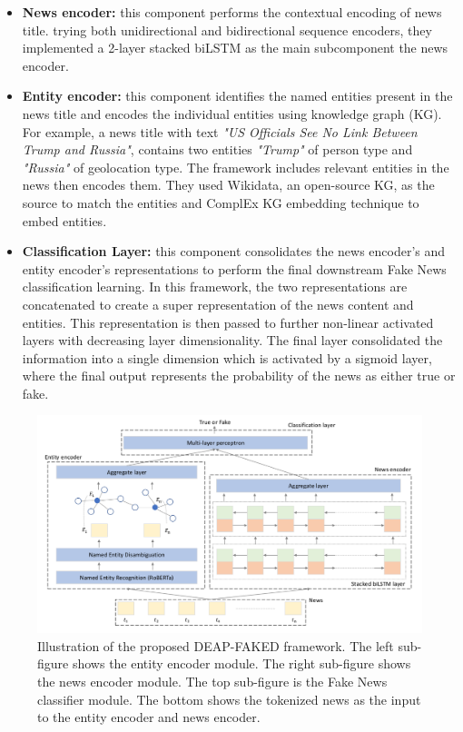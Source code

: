 \documentclass[conference]{IEEEtran}
\begin{document}
\begin{appendices}
\begin{itemize}
\item \textbf{News encoder:} this component performs the contextual encoding of news title. trying both unidirectional and bidirectional sequence encoders, they implemented a 2-layer stacked biLSTM as the main subcomponent the news encoder.
\item \textbf{Entity encoder:} this component identifies the named entities present in the news title and encodes the individual entities using knowledge graph (KG).
For example, a news title with text \textit{"US Officials See No Link Between Trump and Russia"}, contains two entities \textit{"Trump"} of person type and \textit{"Russia"} of geolocation type.
The framework includes relevant entities in the news then encodes them. They used Wikidata, an open-source KG, as the source to match the entities and ComplEx KG embedding technique to embed entities.
\item \textbf{Classification Layer:} this component consolidates the news encoder's and entity encoder's representations to perform the final downstream Fake News classification learning.
In this framework, the two representations are concatenated to create a super representation of the news content and entities. This representation is then passed to further non-linear activated layers with decreasing layer dimensionality. The final layer consolidated the information into a single dimension which is activated by a sigmoid layer, where the final output represents the probability of the news as either true or fake.
\end{itemize}

\begin{figure}[htp]
	\centering
	\includegraphics[scale=0.45]{deap_fake_framework.png}
	\caption{Illustration of the proposed DEAP-FAKED framework. The left sub-figure shows the entity encoder module. The right sub-figure shows the news encoder module. The top sub-figure is the Fake News classifier module. The bottom shows the tokenized news as the input to the entity encoder and news encoder. \cite{mayank2021deap}}
\end{figure}


\end{appendices}
\end{document}
